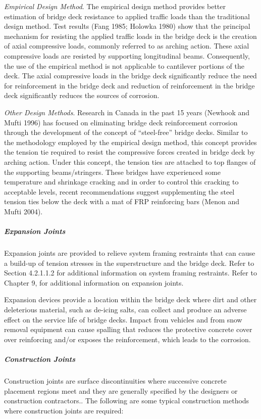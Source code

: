 \emph{Empirical Design Method}. The empirical design method provides better estimation of bridge deck resistance to
applied traffic loads than the traditional design method. Test results (Fang 1985; Holowka 1980) show that the
principal mechanism for resisting the applied traffic loads in the bridge deck is the creation of axial compressive
loads, commonly referred to as arching action. These axial compressive loads are resisted by supporting longitudinal
beams. Consequently, the use of the empirical method is not applicable to cantilever portions of the deck. The axial
compressive loads in the bridge deck significantly reduce the need for reinforcement in the bridge deck and reduction
of reinforcement in the bridge deck significantly reduces the sources of corrosion.

\emph{Other Design Methods}. Research in Canada in the past 15 years (Newhook and Mufti 1996) has focused on
eliminating bridge deck reinforcement corrosion through the development of the concept of “steel-free” bridge decks.
Similar to the methodology employed by the empirical design method, this concept provides the tension tie required
to resist the compressive forces created in bridge deck by arching action. Under this concept, the tension ties are
attached to top flanges of the supporting beams/stringers. These bridges have experienced some temperature and
shrinkage cracking and in order to control this cracking to acceptable levels, recent recommendations suggest
supplementing the steel tension ties below the deck with a mat of FRP reinforcing bars (Menon and Mufti 2004).

\subparagraph{Expansion Joints}
Expansion joints are provided to relieve system framing restraints that can cause a build-up of tension stresses in
the superstructure and the bridge deck. Refer to Section 4.2.1.1.2 for additional information on system framing
restraints. Refer to Chapter 9, for additional information on expansion joints.

Expansion devices provide a location within the bridge deck where dirt and other deleterious material, such as
de-icing salts, can collect and produce an adverse effect on the service life of bridge decks. Impact from vehicles and
from snow removal equipment can cause spalling that reduces the protective concrete cover over reinforcing and/or
exposes the reinforcement, which leads to the corrosion.

\subparagraph{Construction Joints}
Construction joints are surface discontinuities where successive concrete placement regions meet and they are
generally specified by the designers or construction contractors.. The following are some typical construction
methods where construction joints are required:

